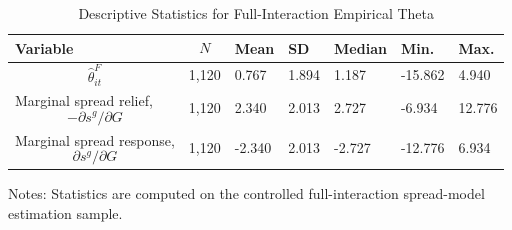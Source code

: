 \begin{table}[H]\centering
\begin{threeparttable}
\caption{Descriptive Statistics for Full-Interaction Empirical Theta}
\label{tab:theta_descriptive_stats}
\scriptsize
\begin{tabularx}{\textwidth}{lYYYYYY}
\toprule
Variable & $$N$$ & Mean & SD & Median & Min. & Max. \\
\midrule
$$\widehat{\theta}^{F}_{it}$$ & 1,120 & 0.767 & 1.894 & 1.187 & -15.862 & 4.940 \\
Marginal spread relief, $$-\partial s^g/\partial G$$ & 1,120 & 2.340 & 2.013 & 2.727 & -6.934 & 12.776 \\
Marginal spread response, $$\partial s^g/\partial G$$ & 1,120 & -2.340 & 2.013 & -2.727 & -12.776 & 6.934 \\
\bottomrule
\end{tabularx}
\begin{tablenotes}[flushleft]\footnotesize
\item Notes: Statistics are computed on the controlled full-interaction spread-model estimation sample.
\end{tablenotes}
\end{threeparttable}
\end{table}
